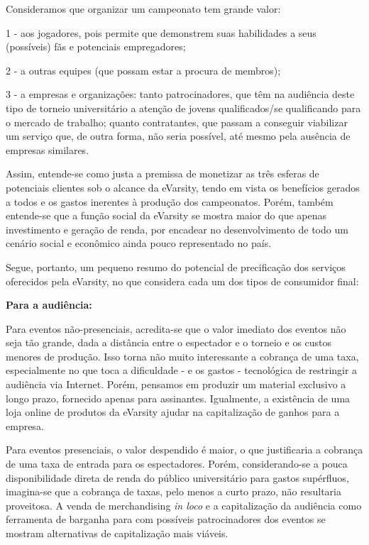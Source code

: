 \documentclass[a4paper, 12pt]{paper}
\begin{document}
Consideramos que organizar um campeonato tem grande valor: 

1 - aos jogadores, pois permite que demonstrem suas habilidades a seus (possíveis) fãs e potenciais empregadores; 

2 - a outras equipes (que possam estar a procura de membros); 

3 - a empresas e organizações: tanto patrocinadores, que têm na audiência deste tipo de torneio universitário a atenção de jovens qualificados/se qualificando para o mercado de trabalho; quanto contratantes, que passam a conseguir viabilizar um serviço que, de outra forma, não seria possível, até mesmo pela ausência de empresas similares.

Assim, entende-se como justa a premissa de monetizar as três esferas de potenciais clientes sob o alcance da eVarsity, tendo em vista os benefícios gerados a todos e os gastos inerentes à produção dos campeonatos. Porém, também entende-se que a função social da eVarsity se mostra maior do que apenas investimento e geração de renda, por encadear no desenvolvimento de todo um cenário social e econômico ainda pouco representado no país.

Segue, portanto, um pequeno resumo do potencial de precificação dos serviços oferecidos pela eVarsity, no que considera cada um dos tipos de consumidor final:

\textbf{Para a audiência:}

Para eventos não-presenciais, acredita-se que o valor imediato dos eventos não seja tão grande, dada a distância entre o espectador e o torneio e os custos menores de produção. Isso torna não muito interessante a cobrança de uma taxa, especialmente no que toca a dificuldade - e os gastos -  tecnológica de restringir a audiência via Internet. Porém, pensamos em produzir um material exclusivo a longo prazo, fornecido apenas para assinantes. Igualmente, a existência de uma loja online de produtos da eVarsity ajudar na capitalização de ganhos para a empresa.

Para eventos presenciais, o valor despendido é maior, o que justificaria a cobrança de uma taxa de entrada para os espectadores. Porém, considerando-se a pouca disponibilidade direta de renda do público universitário para gastos supérfluos, imagina-se que a cobrança de taxas, pelo menos a curto prazo, não resultaria proveitosa. A venda de merchandising \textit{in loco} e a capitalização da audiência como ferramenta de barganha para com possíveis patrocinadores dos eventos se mostram alternativas de capitalização mais viáveis.
\end{document}
